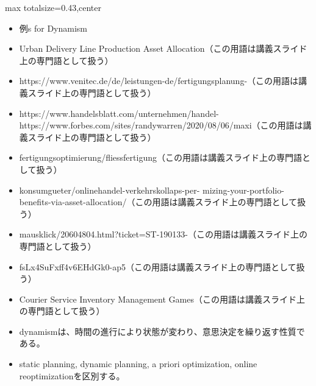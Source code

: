 \clearpage
{}
\begin{minipage}[t]{0.405\textwidth}
\begin{adjustbox}{max totalsize={\textwidth}{0.43\textheight},center}
\begin{minipage}{\textwidth}\scriptsize
{}\begin{itemize}
\item 例s for Dynamism
\item Urban Delivery Line Production Asset Allocation（この用語は講義スライド上の専門語として扱う）
\item https://www.venitec.de/de/leistungen-de/fertigungsplanung-（この用語は講義スライド上の専門語として扱う）
\item https://www.handelsblatt.com/unternehmen/handel- https://www.forbes.com/sites/randywarren/2020/08/06/maxi（この用語は講義スライド上の専門語として扱う）
\item fertigungsoptimierung/fliessfertigung（この用語は講義スライド上の専門語として扱う）
\item konsumgueter/onlinehandel-verkehrskollaps-per- mizing-your-portfolio-benefits-via-asset-allocation/（この用語は講義スライド上の専門語として扱う）
\item mausklick/20604804.html?ticket=ST-190133-（この用語は講義スライド上の専門語として扱う）
\item fsLx4SuFxff4v6EHdGk0-ap5（この用語は講義スライド上の専門語として扱う）
\item Courier Service Inventory Management Games（この用語は講義スライド上の専門語として扱う）
\end{itemize}\begin{itemize}
\item dynamismは、時間の進行により状態が変わり、意思決定を繰り返す性質である。
\item static planning, dynamic planning, a priori optimization, online reoptimizationを区別する。
\end{itemize}
\end{minipage}
\end{adjustbox}
\end{minipage}\hfill
